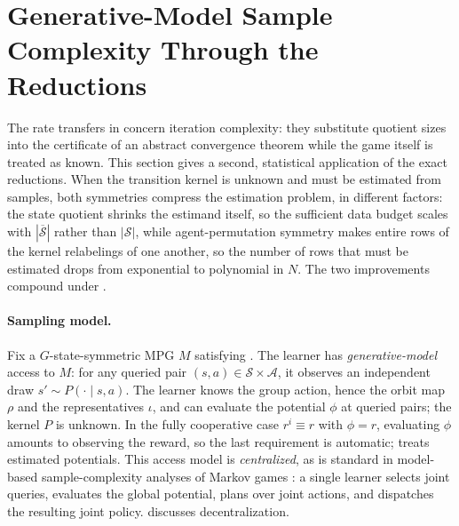 \documentclass{article}
\theoremstyle{plain}
\theoremstyle{definition}
\theoremstyle{remark}
\newcommand{\St}{\mathcal{S}}
\newcommand{\Ac}{\mathcal{A}}
\newcommand{\abs}[1]{\left\lvert#1\right\rvert}
\newcommand{\quotient}[1]{\overline{#1}}
\begin{document}
\section{Generative-Model Sample Complexity Through the Reductions}
\label{sec:sample-complexity}

The rate transfers in
concern iteration complexity: they substitute quotient sizes into the
certificate of an abstract convergence theorem while the game itself is treated
as known. This section gives a second, statistical application of the
exact reductions. When the transition kernel is unknown and must be estimated
from samples, both symmetries compress the estimation problem, in different
factors: the state quotient shrinks the estimand itself, so the sufficient
data budget scales with $\abs{\quotient\St}$ rather than $\abs\St$, while
agent-permutation symmetry makes entire rows of the kernel relabelings of one
another, so the number of rows that must be estimated drops from exponential
to polynomial in $N$. The two improvements compound under
.

\paragraph{Sampling model.}
Fix a $G$-state-symmetric MPG $M$ satisfying
. The learner has
\emph{generative-model} access to $M$: for any queried pair
$(s,a)\in\St\times\Ac$, it observes an independent draw
$s'\sim P(\cdot\mid s,a)$. The learner knows the group action, hence the orbit
map $\rho$ and the representatives $\iota$, and can evaluate the potential
$\phi$ at queried pairs; the kernel $P$ is unknown. In the fully cooperative
case $r^i\equiv r$ with $\phi=r$, evaluating $\phi$ amounts to observing the
reward, so the last requirement is automatic;
 treats estimated potentials. This access model is
\emph{centralized}, as is standard in model-based sample-complexity analyses
of Markov games \citep{zhang2020modelbased,subramanian2023robustness}: a
single learner selects joint queries, evaluates the global potential, plans
over joint actions, and dispatches the resulting joint policy.
 discusses decentralization.
\end{document}
